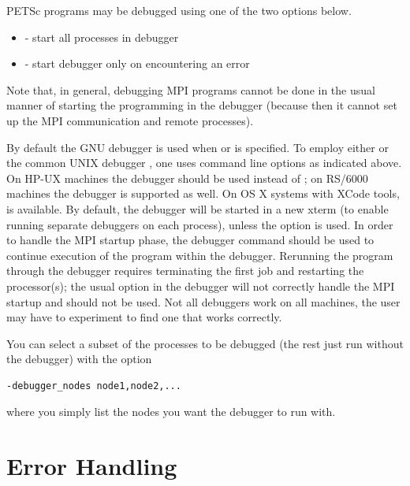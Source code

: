 {{{PETSc programs may be debugged using one of the two options below.
\begin{itemize}
\item {}  
     - start all processes in debugger
\item {} 
       - start debugger only on encountering an error
\end{itemize}
Note that, in general, debugging MPI programs cannot be done in the usual
manner of starting the programming in the debugger (because then it cannot
set up the MPI communication and remote processes).

By default the GNU debugger  is used when 
or  is specified. 
To employ either  or the common UNIX debugger , one uses
command line options as indicated above. On HP-UX machines the debugger
 should be used instead of ; on RS/6000 machines the
 debugger is supported as well. 
On OS X systems with XCode tools,  is available.
By  default, the debugger will be started in a new xterm (to enable
running separate debuggers on each process), unless the option
 is used.
In order to handle the MPI startup phase, the debugger command 
should be used to continue execution of the program within the debugger.
Rerunning the program through the debugger requires terminating
the first job and restarting the processor(s); the usual 
option in the debugger will not correctly handle the MPI startup and
should not be used.  Not all debuggers work on all machines, the user
may have to experiment to find one that works correctly.

You can select a subset of the processes to be debugged (the rest just run
without the debugger) with the option
\begin{lstlisting}
-debugger_nodes node1,node2,...
\end{lstlisting}
where you simply list the nodes you want the debugger to run with.

\section{Error Handling}  

}}}
